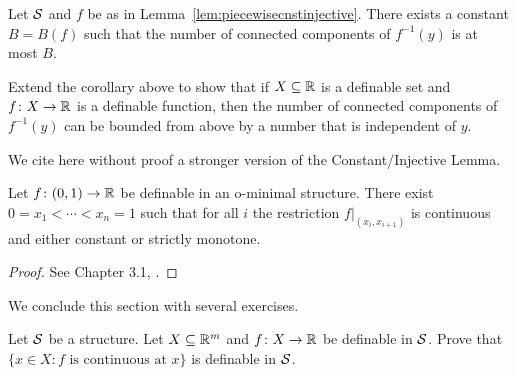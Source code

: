 \begin{corollary}
  Let ${\mathcal S}$ and  $f$ be as in Lemma~\ref{lem:piecewisecnstinjective}.
  There exists a constant $B=B(f)$ such that the number of connected
  components of $f^{-1}(y)$ is at most $B$. 
\end{corollary}

\begin{exercise}
  Extend the corollary above to show that if $X\subseteq{\mathbb{R}}$ is a
  definable set and $f\colon X\rightarrow{\mathbb{R}}$ is a definable function,
  then the number of connected components of $f^{-1}(y)$ can be bounded
  from above by a number that is independent of $y$.  
\end{exercise}


We cite here without proof a stronger version of the
Constant/Injective Lemma.

\begin{theorem}
  \label{thm:monotone}
  Let $f\colon (0,1)\rightarrow{\mathbb{R}}$ be definable in an o-minimal
  structure. There exist $0=x_1<\cdots <x_n =1$
  such that for all $i$ the restriction  $f|_{(x_i,x_{i+1})}$
  is continuous and either constant or strictly monotone.
\end{theorem}
\begin{proof}
  See Chapter 3.1, \cite{D:oMin}. 
\end{proof}

We conclude this section with several exercises.


\begin{exercise}
  Let ${\mathcal S}$ be a structure. 
  Let $X\subseteq{\mathbb{R}}^m$  and $f\colon X\rightarrow{\mathbb{R}}$ be definable in ${\mathcal S}$.
  Prove that $\{ x \in X : f \text{ is continuous at }x\}$ is
  definable in ${\mathcal S}$.
\end{exercise}

